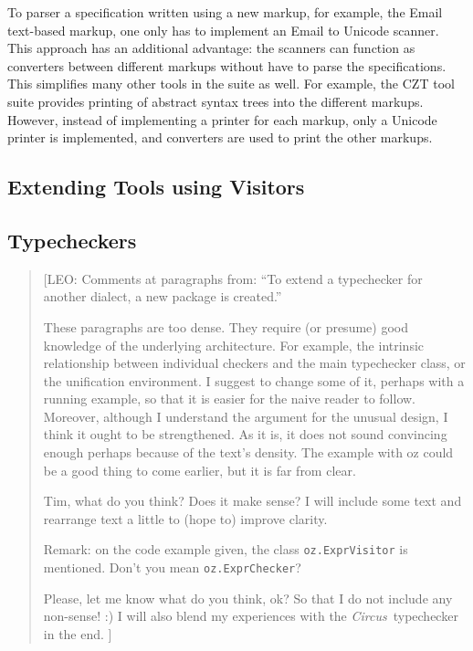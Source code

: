 \documentclass{llncs}
\newcommand{\Circus}{{\sf\slshape Circus}}
\begin{document}
To parser a specification written using a new markup, for example, the
Email text-based markup, one only has to implement an Email to Unicode
scanner. This approach has an additional advantage: the scanners can function as
converters between different markups without have to parse the
specifications. This simplifies many other tools in the suite as
well. For example, the CZT tool suite provides printing of abstract
syntax trees into the different markups. However, instead of
implementing a printer for each markup, only a Unicode printer is
implemented, and converters are used to print the other markups.

\subsection{Extending Tools using Visitors}
\label{extending-visitors}


\subsection{Typecheckers}

\begin{quotation}
[LEO: Comments at paragraphs from: ``To extend a typechecker for another dialect,
      a new package is created.''

      \vspace{5pt}

      These paragraphs are too dense. They require (or presume) good knowledge of
      the underlying architecture. For example, the intrinsic relationship between
      individual checkers and the main typechecker class, or the unification environment.
      I suggest to change some of it, perhaps with a running example, so that it is easier
      for the naive reader to follow.
      Moreover, although I understand the argument for the unusual design,
      I think it ought to be strengthened. As it is, it does not sound convincing
      enough perhaps because of the text's density. The example with oz could be
      a good thing to come earlier, but it is far from clear.

      \vspace{5pt}

      Tim, what do you think? Does it make sense?
      I will include some text and rearrange text a little to (hope to) improve clarity.

      Remark: on the code example given, the class {\tt oz.ExprVisitor} is mentioned.
      Don't you mean {\tt oz.ExprChecker}?

      Please, let me know what do you think, ok? So that I do not include any non-sense! :)
      I will also blend my experiences with the \Circus\ typechecker in the end.
      ]
\end{quotation}
\end{document}
